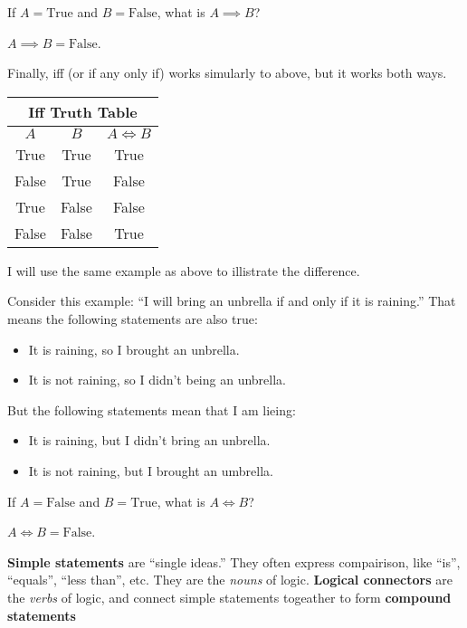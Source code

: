\begin{boxexample}{}{}
	If $A=\text{True}$ and $B=\text{False}$, what is $A \implies B$?
	
	$A \implies B = \text{False}$.
\end{boxexample}

Finally, iff (or if any only if) works simularly to above, but it works both ways.

\medskip
\begin{tabular}{c|c|c}
	\hline
	\multicolumn{3}{c}{Iff Truth Table}\\
	\hline
	$A$ & $B$ & $A \iff B$\\
	\hline
	True & True & True\\
	False & True & False\\
	True & False & False\\
	False & False & True\\
	\hline
\end{tabular}
\medskip

I will use the same example as above to illistrate the difference.

\begin{boxexample}{}{}
	Consider this example: ``I will bring an unbrella if and only if it is raining.'' That means the following statements are also true:
	\begin{itemize}
		\item It is raining, so I brought an unbrella.
		\item It is not raining, so I didn't being an unbrella.
	\end{itemize}
	But the following statements mean that I am lieing:
	\begin{itemize}
		\item It is raining, but I didn't bring an unbrella.
		\item It is not raining, but I brought an umbrella.
	\end{itemize}
\end{boxexample}

\begin{boxexample}{}{}
	If $A=\text{False}$ and $B=\text{True}$, what is $A \iff B$?
	
	$A \iff B = \text{False}$.
\end{boxexample}

{\bf Simple statements} are ``single ideas.'' They often express compairison, like ``is'', ``equals'', ``less than'', etc. They are the \emph{nouns} of logic. {\bf Logical connectors} are the \emph{verbs} of logic, and connect simple statements togeather to form {\bf compound statements}

